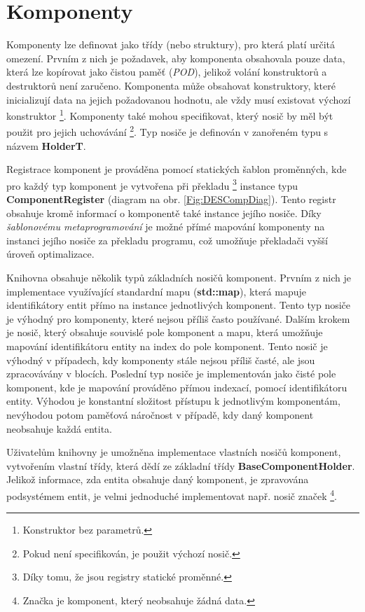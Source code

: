 \section{Komponenty}

Komponenty lze definovat jako třídy (nebo struktury), pro která platí určitá omezení. Prvním z nich je požadavek, aby komponenta obsahovala pouze data, která lze kopírovat jako čistou paměť (\emph{POD}), jelikož volání konstruktorů a destruktorů není zaručeno. Komponenta může obsahovat konstruktory, které inicializují data na jejich požadovanou hodnotu, ale vždy musí existovat výchozí konstruktor \footnote{Konstruktor bez parametrů.}. Komponenty také mohou specifikovat, který nosič by měl být použit pro jejich uchovávání \footnote{Pokud není specifikován, je použit výchozí nosič.}. Typ nosiče je definován v zanořeném typu s názvem \textbf{HolderT}.

Registrace komponent je prováděna pomocí statických šablon proměnných, kde pro každý typ komponent je vytvořena při překladu \footnote{Díky tomu, že jsou registry statické proměnné.} instance typu \textbf{ComponentRegister} (diagram na obr. \ref{Fig:DESCompDiag}). Tento registr obsahuje kromě informací o komponentě také instance jejího nosiče. Díky \emph{šablonovému metaprogramování} je možné přímé mapování komponenty na instanci jejího nosiče za překladu programu, což umožňuje překladači vyšší úroveň optimalizace.

Knihovna obsahuje několik typů základních nosičů komponent. Prvním z nich je implementace využívající standardní mapu (\textbf{std::map}), která mapuje identifikátory entit přímo na instance jednotlivých komponent. Tento typ nosiče je výhodný pro komponenty, které nejsou příliš často používané. Dalším krokem je nosič, který obsahuje souvislé pole komponent a mapu, která umožňuje mapování identifikátoru entity na index do pole komponent. Tento nosič je výhodný v případech, kdy komponenty stále nejsou příliš časté, ale jsou zpracovávány v blocích. Poslední typ nosiče je implementován jako čisté pole komponent, kde je mapování prováděno přímou indexací, pomocí identifikátoru entity. Výhodou je konstantní složitost přístupu k jednotlivým komponentám, nevýhodou potom paměťová náročnost v případě, kdy daný komponent neobsahuje každá entita. 

Uživatelům knihovny je umožněna implementace vlastních nosičů komponent, vytvořením vlastní třídy, která dědí ze základní třídy \textbf{BaseComponentHolder}. Jelikož informace, zda entita obsahuje daný komponent, je zpravována podsystémem entit, je velmi jednoduché implementovat např. nosič značek \footnote{Značka je komponent, který neobsahuje žádná data.}. 

